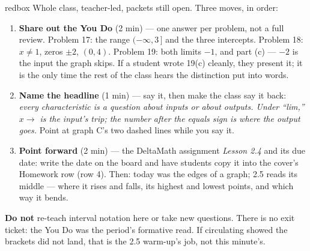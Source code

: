 \documentclass[10pt]{article}
\begin{document}
\boxguard[20]
\begin{skillbox}{redbox}
Whole class, teacher-led, packets still open. Three moves, in order:
\begin{enumerate}[itemsep=3pt]
  \item \textbf{Share out the You Do} (2 min) --- one answer per problem, not a full review.
        Problem 17: the range $(-\infty, 3\,]$ and the three intercepts. Problem 18: $x \ne 1$,
        zeros $\pm 2$, $(0, 4)$. Problem 19: both limits $-1$, and part (c) --- $-2$ is the input
        the graph skips. If a student wrote 19(c) cleanly, they present it; it is the only
        time the rest of the class hears the distinction put into words.
  \item \textbf{Name the headline} (1 min) --- say it, then make the class say it back:
        \textit{every characteristic is a question about inputs or about outputs. Under
        ``lim,'' $x \to$ is the input's trip; the number after the equals sign is where the
        output goes.} Point at graph C's two dashed lines while you say it.
  \item \textbf{Point forward} (2 min) --- the DeltaMath assignment \textit{Lesson 2.4} and its
        due date: write the date on the board and have students copy it into the cover's
        Homework row (row 4). Then: today was the edges of a graph; 2.5 reads its middle ---
        where it rises and falls, its highest and lowest points, and which way it bends.
\end{enumerate}
\textbf{Do not} re-teach interval notation here or take new questions. There is no exit
ticket: the You Do was the period's formative read. If circulating showed the
brackets did not land, that is the 2.5 warm-up's job, not this minute's.
\end{skillbox}
\end{document}
